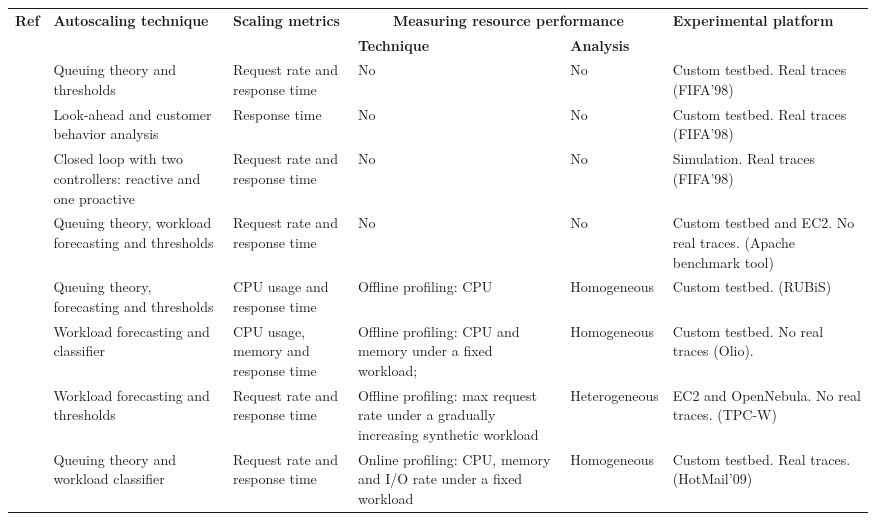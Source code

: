 \begin{table*}
  {\scriptsize 
    \begin{tabular}{  | p{0.3cm} | p{3.9cm} | p{3.2cm} | p{3.6cm} | p{1.4cm} | p{3.2cm} |}
    \hline
\textbf{Ref} & \textbf{Autoscaling technique}   & \textbf{Scaling metrics} & \multicolumn{2}{|c|}{\textbf{Measuring resource performance}}    & \textbf{Experimental platform} \\ 
 &   &    & \textbf{Technique} & \textbf{Analysis}  &  \\ \hline
\textit{\cite{urgaonkar_agile_2008}}   & Queuing theory and thresholds  & Request rate and response time &  No  & No & Custom testbed. \newline Real traces (FIFA'98) \\ \hline
\textit{\cite{roy_efficient_2011}}   & Look-ahead and customer behavior analysis  & Response time &  No  & No & Custom testbed. \newline Real traces (FIFA'98)  \\ \hline
\textit{\cite{ali-eldin_2012}}   & Closed loop with two controllers: reactive and one proactive   & Request rate and response time  & No & No & Simulation. \newline Real traces (FIFA'98)  \\ \hline
\textit{\cite{bunch_2012}}   & Queuing theory, workload forecasting and thresholds  & Request rate and response time  & No &  No  & Custom testbed and EC2. \newline No real traces. (Apache benchmark tool)\\ \hline
\textit{\cite{roy_2011}}   & Queuing theory, forecasting and thresholds   &  CPU usage and response time  & Offline profiling: CPU & Homogeneous &  Custom testbed. (RUBiS)  \\ \hline
\textit{\cite{smartscale_2012}}   &  Workload forecasting and classifier  &  CPU usage, memory and response time & Offline profiling: CPU and memory under a fixed workload; & Homogeneous &  Custom  testbed. \newline No real traces (Olio).  \\ \hline
\textit{\cite{sharma_cost-aware_2011}}   & Workload forecasting and thresholds   & Request rate and response time  & Offline profiling: max request rate under a gradually increasing synthetic workload & Heterogeneous &  EC2 and OpenNebula. \newline No real traces. (TPC-W) \\ \hline
\textit{\cite{dejavu2012}}   & Queuing theory and workload classifier  &  Request rate and response time  & Online profiling: CPU, memory and I/O rate under a fixed workload & Homogeneous &  Custom testbed. \newline Real traces. (HotMail'09)  \\ \hline
 \end{tabular}

}
\end{table*}
